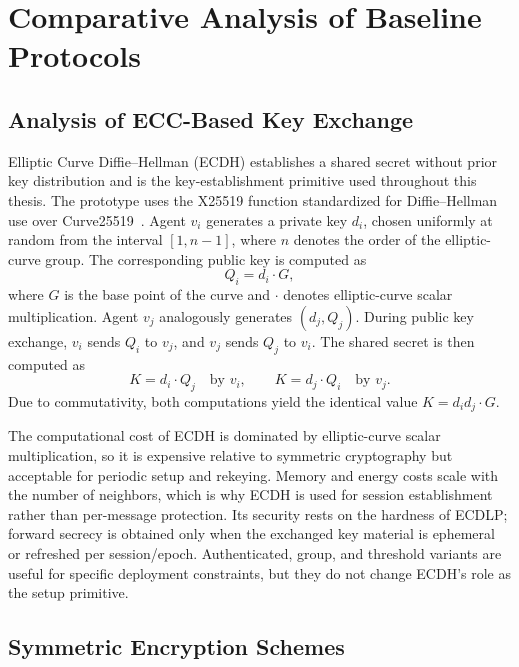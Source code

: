 \chapter{Comparative Analysis of Baseline Protocols}
\label{chap:comparison}

\section{Analysis of ECC-Based Key Exchange}
\label{sec:ecc_key_exchange}

Elliptic Curve Diffie--Hellman (ECDH) establishes a shared secret without prior key distribution and is the key-establishment primitive used throughout this thesis. The prototype uses the X25519 function standardized for Diffie--Hellman use over Curve25519~\cite{rfc7748}. Agent $v_i$ generates a private key $d_i$, chosen uniformly at random from the interval $[1, n-1]$, where $n$ denotes the order of the elliptic-curve group. The corresponding public key is computed as
\begin{equation}
Q_i = d_i \cdot G,
\label{eq:ecdh_public_key}
\end{equation}
where $G$ is the base point of the curve and $\cdot$ denotes elliptic-curve scalar multiplication.
Agent $v_j$ analogously generates $(d_j, Q_j)$. During public key exchange, $v_i$ sends $Q_i$ to $v_j$, and $v_j$ sends $Q_j$ to $v_i$. The shared secret is then computed as
\[
K = d_i \cdot Q_j \quad \text{by } v_i, \qquad
K = d_j \cdot Q_i \quad \text{by } v_j.
\]
Due to commutativity, both computations yield the identical value $K = d_i d_j \cdot G$.

The computational cost of ECDH is dominated by elliptic-curve scalar multiplication, so it is expensive relative to symmetric cryptography but acceptable for periodic setup and rekeying. Memory and energy costs scale with the number of neighbors, which is why ECDH is used for session establishment rather than per-message protection. Its security rests on the hardness of ECDLP; forward secrecy is obtained only when the exchanged key material is ephemeral or refreshed per session/epoch. Authenticated, group, and threshold variants are useful for specific deployment constraints, but they do not change ECDH's role as the setup primitive.


\section{Symmetric Encryption Schemes}
\label{sec:symmetric_encryption}

